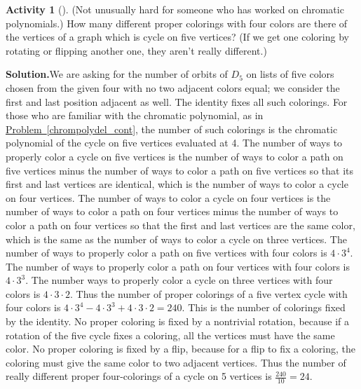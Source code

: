 \documentclass[10pt,]{book}
\theoremstyle{plain}
\theoremstyle{definition}
\newtheorem{activity}[project]{Activity}
\numberwithin{equation}{chapter}
\begin{document}
\begin{activity}[]\label{activity-302}
(Not unusually hard for someone who has worked on chromatic polynomials.) How many different proper colorings with four colors are there of the vertices of a graph which is cycle on five vertices? (If we get one coloring by rotating or flipping another one, they aren't really different.)%
\par\medskip\noindent%
\textbf{Solution.}\quad We are asking for the number of orbits of \(D_5\) on lists of five colors chosen from the given four with no two adjacent colors equal; we consider the first and last position adjacent as well. The identity fixes all such colorings. For those who are familiar with the chromatic polynomial, as in \hyperref[chrompolydel_cont]{Problem~\ref{chrompolydel_cont}}, the number of such colorings is the chromatic polynomial of the cycle on five vertices evaluated at 4. The number of ways to properly color a cycle on five vertices is the number of ways to color a path on five vertices minus the number of ways to color a path on five vertices so that its first and last vertices are identical, which is the number of ways to color a cycle on four vertices. The number of ways to color a cycle on four vertices is the number of ways to color a path on four vertices minus the number of ways to color a path on four vertices so that the first and last vertices are the same color, which is the same as the number of ways to color a cycle on three vertices. The number of ways to properly color a path on five vertices with four colors is \(4\cdot3^4\). The number of ways to properly color a path on four vertices with four colors is \(4\cdot3^3\). The number ways to properly color a cycle on three vertices with four colors is \(4\cdot3\cdot2\). Thus the number of proper colorings of a five vertex cycle with four colors is \(4\cdot3^4-4\cdot3^3
+4\cdot3\cdot2=240\). This is the number of colorings fixed by the identity. No proper coloring is fixed by a nontrivial rotation, because if a rotation of the five cycle fixes a coloring, all the vertices must have the same color. No proper coloring is fixed by a flip, because for a flip to fix a coloring, the coloring must give the same color to two adjacent vertices. Thus the number of really different proper four-colorings of a cycle on 5 vertices is \(\frac{240}{10}=24\).%
\end{activity}
\end{document}
